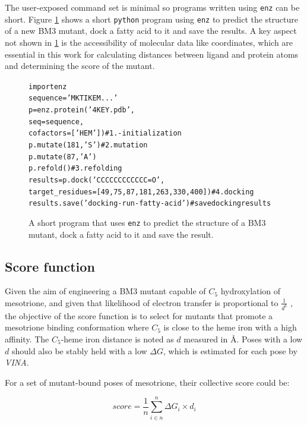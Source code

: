 \documentclass[16pt]{article}
\begin{document}
The user-exposed command set is minimal so programs written using \texttt{enz} can be short.
Figure \ref{alltt} shows a short \texttt{python} program using \texttt{enz} to predict the structure of a new BM3 mutant, dock a fatty acid to it and save the results.
A key aspect not shown in \ref{alltt} is the accessibility of molecular data like coordinates, which are essential in this work for calculating distances between ligand and protein atoms and determining the score of the mutant.

\begin{figure}
	\caption{\label{alltt} A short program that uses \texttt{enz} to predict the structure of a BM3 mutant, dock a fatty acid to it and save the result.}
\begin{alltt}
        import enz 
        sequence = 'MKTIKEM...' 
        p = enz.protein('4KEY.pdb', 
                        seq=sequence, 
                        cofactors=['HEM']) \# 1. - initialization 
        p.mutate(181, 'S') \# 2. mutation
        p.mutate(87, 'A')
        p.refold() \# 3. refolding
        results = p.dock('CCCCCCCCCCCC=O',
                         target\_residues=[49, 75, 87, 181, 263, 330, 400]) \# 4. docking 
        results.save('docking-run-fatty-acid') \# save docking results
\end{alltt}
\end{figure}
\subsection{Score function \label{scorefn}}
Given the aim of engineering a BM3 mutant capable of $C_5$ hydroxylation of mesotrione, and given that likelihood of electron transfer is proportional to $\frac{1}{d^6}$ \cite{moser2008distance}, the objective of the score function is to select for mutants that promote a mesotrione binding conformation where $C_5$ is close to the heme iron with a high affinity.
The $C_5$-heme iron distance is noted as $d$ measured in \AA.
Poses with a low $d$ should also be stably held with a low $\Delta G$, which is estimated for each pose by \textit{VINA}.

For a set of mutant-bound poses of mesotrione, their collective score could be:

\begin{equation}
	score = \frac{1}{n} \sum^{n}_{i\in n} \Delta G_{i} \times d_i
\end{equation}
\end{document}
